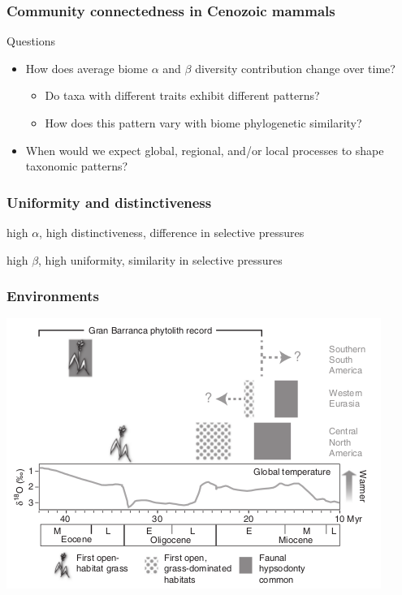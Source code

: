 \documentclass{beamer}
\begin{document}
\begin{frame}
  \frametitle{Community connectedness in Cenozoic mammals}

  \begin{block}{Questions}
    \begin{itemize}
      \item How does average biome \(\alpha\) and \(\beta\) diversity contribution change over time?
        \begin{itemize}
          \item Do taxa with different traits exhibit different patterns?
          \item How does this pattern vary with biome phylogenetic similarity? 
        \end{itemize}
      \item When would we expect global, regional, and/or local processes to shape taxonomic patterns?
    \end{itemize}
  \end{block}
\end{frame}

\begin{frame}
  \frametitle{Uniformity and distinctiveness}
  
  high \(\alpha\), high distinctiveness, difference in selective pressures
  
  \vspace{1cm}

  high \(\beta\), high uniformity, similarity in selective pressures

\end{frame}

\begin{frame}
  \frametitle{Environments}

  \includegraphics[height=0.8\textheight,width=\textwidth,keepaspectratio=true]{figure/stromberg}

  \tiny{}
\end{frame}
\end{document}
